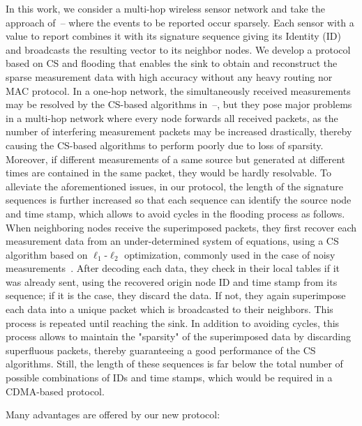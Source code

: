 \documentclass[letterpaper,conference]{IEEEtran}
\begin{document}
In this work, we consider a multi-hop wireless sensor network and take the approach of~\cite{Men09mar}--\cite{Bha09jun} where the events to be reported occur sparsely. Each sensor with a value to report combines it with its signature sequence giving its Identity (ID) and broadcasts the resulting vector to its neighbor nodes. We develop a protocol based on CS and flooding that enables the sink to obtain and reconstruct the sparse measurement data with high accuracy without any heavy routing nor MAC protocol. In a one-hop network, the simultaneously received measurements may be resolved by the CS-based algorithms in~\cite{Men09mar}--\cite{Bha09jun}, but they pose major problems in a multi-hop network where every node forwards all received packets, as the number of interfering measurement packets may be increased drastically, thereby causing the CS-based algorithms to perform poorly due to loss of sparsity. Moreover, if different measurements of a same source but generated at different times are contained in the same packet, they would be hardly resolvable.
To alleviate the aforementioned issues, in our protocol, the length of the signature sequences is further increased so that each sequence can identify the source node and time stamp, which allows to avoid cycles in the flooding process as follows. When neighboring nodes receive the superimposed packets, they first recover each measurement data from an under-determined system of equations, using a CS algorithm based on $\ell_1$-$\ell_2$ optimization, commonly used in the case of noisy measurements~\cite{Elad10}. After decoding each data, they check in their local tables if it was already sent, using the recovered origin node ID and time stamp from its sequence; if it is the case, they discard the data. If not, they again superimpose each data into a unique packet which is broadcasted to their neighbors. This process is repeated until reaching the sink. In addition to avoiding cycles, this process allows to maintain the "sparsity" of the superimposed data by discarding superfluous packets, thereby guaranteeing a good performance of the CS algorithms. Still, the length of these sequences is far below the total number of possible combinations of IDs and time stamps, which would be required in a CDMA-based protocol.

Many advantages are offered by our new protocol:
\end{document}
